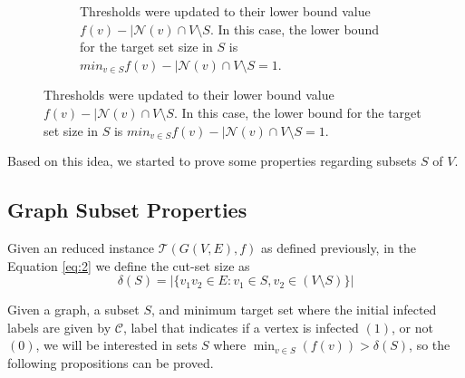 \begin{figure}[!ht]
\begin{subfigure}[t]{0.5\textwidth}
        \caption{Thresholds were updated to their lower bound value $f(v) - | \mathcal{N}(v) \cap V \setminus S$. In this case, the lower bound for the target set size in $S$ is $min_{v \in S} f(v) - | \mathcal{N}(v) \cap V \setminus S = 1$.}
        \label{fig:416b}
    \end{subfigure}
\end{figure}

Based on this idea, we started to prove some properties regarding subsets $S$ of $V$.

\subsection{Graph Subset Properties}

Given an reduced instance $\mathcal{T}(G(V, E), f)$ as defined previously, in the Equation \ref{eq:2} we define the cut-set size as
  \begin{equation}\label{eq:2}
\delta(S) = |\{v_1v_2 \in E:  v_1 \in S , v_2 \in (V\setminus S)\} |
\end{equation}

Given a graph, a subset $S$, and minimum target set where the initial infected labels are given by $\mathcal{C}$, label that indicates if a vertex is infected $(1)$, or not $(0)$, we will be interested in sets $S$ where $\min_{v \in S} (f(v)) > \delta(S)$, so the following propositions can be proved.

